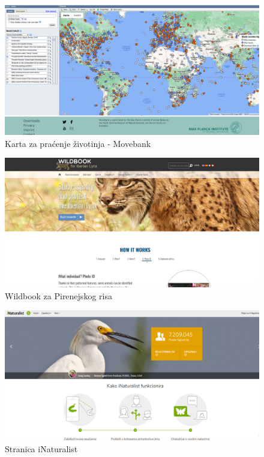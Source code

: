         \begin{figure}[H]
			\includegraphics[scale=0.25]{slike/karta_movebank.PNG} %
			\centering
			\caption{Karta za praćenje životinja - Movebank}
			\label{fig:promjene}
		\end{figure}
		
		\begin{figure}[H]
		    \includegraphics[scale=0.25]{slike/wildbook_ris.PNG} %
			\centering
			\caption{Wildbook za Pirenejskog risa}
			\label{fig:promjene}
		\end{figure}
		
		\begin{figure}[H]
			\includegraphics[scale=0.25]{slike/stranica_inaturalist.PNG} %
			\centering
			\caption{Stranica iNaturalist}
			\label{fig:promjene}
		\end{figure}